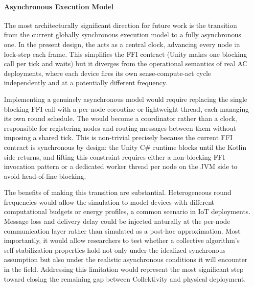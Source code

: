 \paragraph{Asynchronous Execution Model}
The most architecturally significant direction for future work is the transition from the current globally synchronous execution model to a fully asynchronous one. In the present design, the  acts as a central clock, advancing every node in lock-step each frame. This simplifies the \ac{FFI} contract (Unity makes one blocking call per tick and waits) but it diverges from the operational semantics of real \ac{AC} deployments, where each device fires its own sense-compute-act cycle independently and at a potentially different frequency.

Implementing a genuinely asynchronous model would require replacing the single blocking \ac{FFI} call with a per-node coroutine or lightweight thread, each managing its own round schedule. The  would become a coordinator rather than a clock, responsible for registering nodes and routing messages between them without imposing a shared tick. This is non-trivial precisely because the current \ac{FFI} contract is synchronous by design: the Unity C\# runtime blocks until the Kotlin side returns, and lifting this constraint requires either a non-blocking \ac{FFI} invocation pattern or a dedicated worker thread per node on the JVM side to avoid head-of-line blocking.

The benefits of making this transition are substantial. Heterogeneous round frequencies would allow the simulation to model devices with different computational budgets or energy profiles, a common scenario in \ac{IoT} deployments. Message loss and delivery delay could be injected naturally at the per-node communication layer rather than simulated as a post-hoc approximation. Most importantly, it would allow researchers to test whether a collective algorithm's self-stabilization properties hold not only under the idealized synchronous assumption but also under the realistic asynchronous conditions it will encounter in the field. Addressing this limitation would represent the most significant step toward closing the remaining gap between Collektivity and physical deployment.
